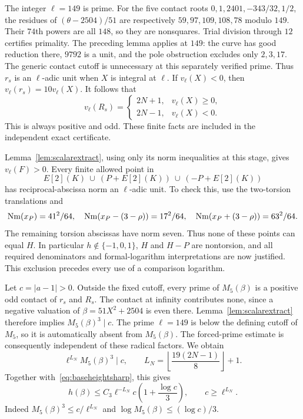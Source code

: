 \documentclass[11pt,a4paper]{article}
\begin{document}
The integer $\ell=149$ is prime. For the five contact roots
$0,1,2401,-343/32,1/2$, the residues of $(\theta-2504)/51$ are
respectively $59,97,109,108,78$ modulo $149$. Their $74$th powers
are all $148$, so they are nonsquares. Trial division through $12$
certifies primality. The preceding lemma applies at $149$: the curve
has good reduction there, $9792$ is a unit, and the pole obstruction
excludes only $2,3,17$. The generic contact cutoff is unnecessary
at this separately verified prime. Thus $r_s$ is an $\ell$-adic unit when $X$ is integral
at $\ell$. If $v_\ell(X)<0$, then $v_\ell(r_s)=10v_\ell(X)$.
It follows that
\begin{equation}\label{eq:forcedvaluation}
 v_\ell(R_s)=
 \begin{cases}2N+1,&v_\ell(X)\ge0,\\2N-1,&v_\ell(X)<0.
 \end{cases}
\end{equation}
This is always positive and odd. These finite facts are included
in the independent exact certificate.

Lemma~\ref{lem:scalarextract}, using only its norm inequalities at
this stage, gives $v_\ell(F)>0$. Every finite allowed point in
\[
                E[2](K)\ \cup\ (P+E[2](K))\ \cup\ (-P+E[2](K))
\]
has reciprocal-abscissa norm an $\ell$-adic unit. To check this,
use the two-torsion translations and
\[
 \operatorname{Nm}(x_P)=41^2/64,\quad
 \operatorname{Nm}(x_P-(3-\rho))=17^2/64,\quad
 \operatorname{Nm}(x_P+(3-\rho))=63^2/64.
\]
The remaining torsion abscissas have norm seven. Thus none of
these points can equal $H$. In particular $h\notin\{-1,0,1\}$,
$H$ and $H-P$ are nontorsion, and all required denominators and
formal-logarithm interpretations are now justified. This exclusion
precedes every use of a comparison logarithm.

Let $c=|a-1|>0$. Outside the fixed cutoff, every prime of
$M_5(\beta)$ is a positive odd contact of $r_s$ and $R_s$.
The contact at infinity contributes none, since a negative valuation
of $\beta=51X^2+2504$ is even there. Lemma~\ref{lem:scalarextract}
therefore implies $M_5(\beta)^3\mid c$. The prime $\ell=149$ is below the defining cutoff of
$M_5$, so it is automatically absent from $M_5(\beta)$.
The forced-prime estimate is consequently independent of these radical
factors. We obtain
\begin{equation}\label{eq:scalardivisibility}
 \ell^{L_N}M_5(\beta)^3\mid c,\qquad
 L_N=\left\lfloor\frac{19(2N-1)}8\right\rfloor+1.
\end{equation}
Together with~\eqref{eq:baseheightsharp}, this gives
\begin{equation}\label{eq:scalar}
 h(\beta)\le C_3\ell^{-L_N}c\left(1+\frac{\log c}{3}\right),
 \qquad c\ge\ell^{L_N}.
\end{equation}
Indeed $M_5(\beta)^3\le c/\ell^{L_N}$ and
$\log M_5(\beta)\le(\log c)/3$.
\end{document}
